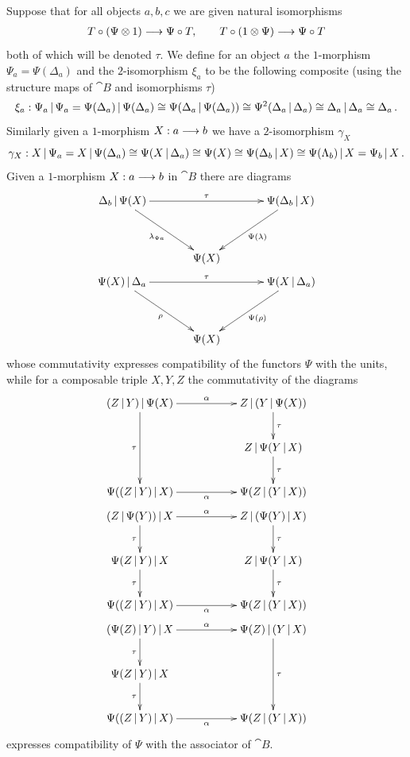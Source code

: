 \documentclass[english,letter paper,12pt,leqno]{article}
\theoremstyle{example}
\numberwithin{equation}{section}
\begin{document}
Suppose that for all objects $a,b,c$ we are given natural isomorphisms
\begin{align*}
T \circ ( \Psi \otimes 1 ) \longrightarrow \Psi \circ T, \qquad T \circ ( 1 \otimes \Psi ) \longrightarrow \Psi \circ T
\end{align*}
both of which will be denoted $\tau$. We define for an object $a$ the $1$-morphism $\Psi_a = \Psi( \Delta_a )$ and the $2$-isomorphism $\xi_a$ to be the following composite (using the structure maps of $\cat{B}$ and isomorphisms $\tau$)
\[
\xi_a: \Psi_a \,|\, \Psi_a = \Psi( \Delta_a ) \,|\, \Psi( \Delta_a ) \cong \Psi( \Delta_a \,|\, \Psi(\Delta_a ) ) \cong \Psi^2( \Delta_a \,|\, \Delta_a ) \cong \Delta_a \,|\, \Delta_a \cong \Delta_a\,.
\]
Similarly given a $1$-morphism $X: a \longrightarrow b$ we have a $2$-isomorphism $\gamma_X$
\[
\gamma_X: X \,|\, \Psi_a = X \,|\, \Psi( \Delta_a ) \cong \Psi( X \,|\, \Delta_a ) \cong \Psi(X) \cong \Psi( \Delta_b \,|\, X ) \cong \Psi( \Lambda_b ) \,|\, X = \Psi_b \,|\, X\,.
\]
Given a $1$-morphism $X: a \longrightarrow b$ in $\cat{B}$ there are diagrams
\begin{gather}
\xymatrix@R+1pc@C+1pc{
\Delta_b \l \Psi (X) \ar[dr]_-{\lambda_{\Psi a}} \ar[rr]^-{\tau} & & \Psi( \Delta_b \l X ) \ar[dl]^-{\Psi( \lambda )}\\
& \Psi(X)
} \label{eq:psiunitor1}\\
\xymatrix@R+1pc@C+1pc{
\Psi(X) \l \Delta_a \ar[rr]^-{\tau}\ar[dr]_-{\rho} & & \Psi( X \l \Delta_a ) \ar[dl]^-{\Psi(\rho)}\\
& \Psi(X)
} \label{eq:psiunitor2}
\end{gather}
whose commutativity expresses compatibility of the functors $\Psi$ with the units, while for a composable triple $X,Y,Z$ the commutativity of the diagrams
\begin{gather}
\xymatrix{
(Z \l Y) \l \Psi(X) \ar[dd]_-{\tau} \ar[rr]^-{\alpha} & & Z \l ( Y \l \Psi(X)) \ar[d]^-{\tau}\\
 & & Z \l \Psi( Y \l X ) \ar[d]^-{\tau}\\
\Psi( (Z \l Y) \l X ) \ar[rr]_-{\alpha} & & \Psi( Z \l ( Y \l X ) )
} \label{eq:psithirdlastdia}\\
\xymatrix{
(Z \l \Psi(Y)) \l X \ar[d]_-{\tau} \ar[rr]^-{\alpha} & & Z \l ( \Psi(Y) \l X) \ar[d]^-{\tau}\\
\Psi( Z \l Y ) \l X \ar[d]_-{\tau} & & Z \l \Psi( Y \l X ) \ar[d]^-{\tau}\\
\Psi( (Z \l Y) \l X ) \ar[rr]_-{\alpha} & & \Psi( Z \l ( Y \l X ) )
} \label{eq:psimiddledia}\\
\xymatrix{
(\Psi(Z) \l Y) \l X \ar[d]_-{\tau} \ar[rr]^-{\alpha} & & \Psi(Z) \l ( Y \l X ) \ar[dd]^-{\tau}\\
\Psi(Z \l Y) \l X \ar[d]_-{\tau} & & \\
\Psi( (Z \l Y) \l X ) \ar[rr]_-{\alpha} & & \Psi( Z \l ( Y \l X ) )
}\label{eq:psilastdia}
\end{gather}
expresses compatibility of $\Psi$ with the associator of $\cat{B}$.
\end{document}
